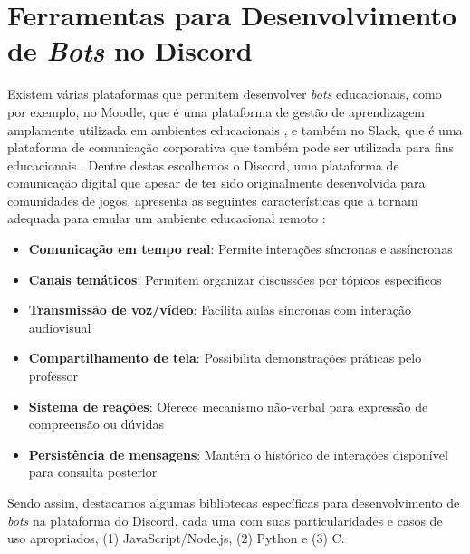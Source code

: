 \section{Ferramentas para Desenvolvimento de \textit{Bots} no Discord}
\label{sec:ferramentas}

Existem várias plataformas que permitem desenvolver \textit{bots} educacionais,
como por exemplo, no Moodle, que é uma plataforma de gestão de aprendizagem
amplamente utilizada em ambientes educacionais \cite{pietrusky2024chatbot}, e
também no Slack, que é uma plataforma de comunicação corporativa que também pode
ser utilizada para fins educacionais \cite{wright2024enhancing}. Dentre destas 
escolhemos o Discord, uma plataforma de comunicação digital que apesar de ter
sido originalmente desenvolvida para comunidades de jogos, apresenta as
seguintes características que a tornam adequada para emular um ambiente
educacional remoto \cite{espinoza2021}:

\begin{itemize}
\item \textbf{Comunicação em tempo real}: Permite interações síncronas e
assíncronas
\item \textbf{Canais temáticos}: Permitem organizar discussões por tópicos
específicos
\item \textbf{Transmissão de voz/vídeo}: Facilita aulas síncronas com interação
audiovisual
\item \textbf{Compartilhamento de tela}: Possibilita demonstrações práticas pelo
professor
\item \textbf{Sistema de reações}: Oferece mecanismo não-verbal para expressão
de compreensão ou dúvidas
\item \textbf{Persistência de mensagens}: Mantém o histórico de interações
disponível para consulta posterior
\end{itemize}

Sendo assim, destacamos algumas bibliotecas específicas para desenvolvimento de
\textit{bots} na plataforma do Discord, cada uma com suas particularidades e
casos de uso apropriados, (1) JavaScript/Node.js, (2) Python e (3) C.

